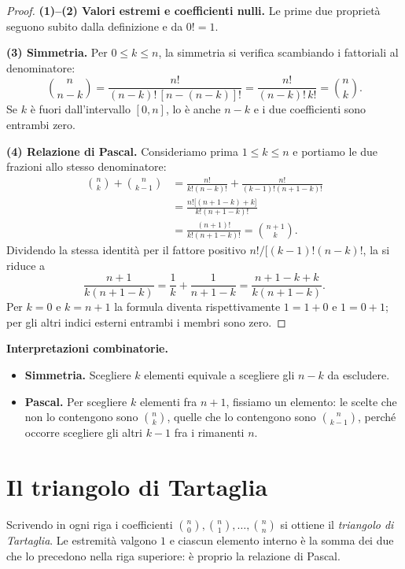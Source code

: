 \begin{proof}
\textbf{(1)--(2) Valori estremi e coefficienti nulli.} Le prime due proprietà seguono subito dalla definizione e da $0!=1$.

\textbf{(3) Simmetria.} Per $0\le k\le n$, la simmetria si verifica scambiando i fattoriali al denominatore:
\[
  \binom n{n-k}
   =\frac{n!}{(n-k)!\,[n-(n-k)]!}
   =\frac{n!}{(n-k)!\,k!}=\binom nk.
\]
Se $k$ è fuori dall'intervallo $[0,n]$, lo è anche $n-k$ e i due coefficienti sono entrambi zero.

\textbf{(4) Relazione di Pascal.} Consideriamo prima $1\le k\le n$ e portiamo le due frazioni allo stesso denominatore:
\begin{align*}
  \binom nk+\binom n{k-1}
  &=\frac{n!}{k!(n-k)!}
    +\frac{n!}{(k-1)!(n+1-k)!}\\
  &=\frac{n!\bigl[(n+1-k)+k\bigr]}{k!(n+1-k)!}\\
  &=\frac{(n+1)!}{k!(n+1-k)!}
   =\binom{n+1}k.
\end{align*}
Dividendo la stessa identità per il fattore positivo $n!/[(k-1)!(n-k)!$, la si riduce a
\[
  \frac{n+1}{k(n+1-k)}
   =\frac1k+\frac1{n+1-k}
   =\frac{n+1-k+k}{k(n+1-k)}.
\]
Per $k=0$ e $k=n+1$ la formula diventa rispettivamente $1=1+0$ e $1=0+1$; per gli altri indici esterni entrambi i membri sono zero.
\end{proof}

\textbf{Interpretazioni combinatorie.}
\begin{itemize}
  \item \textbf{Simmetria.} Scegliere $k$ elementi equivale a scegliere gli $n-k$ da escludere.
  \item \textbf{Pascal.} Per scegliere $k$ elementi fra $n+1$, fissiamo un elemento: le scelte che non lo contengono sono $\binom nk$, quelle che lo contengono sono $\binom n{k-1}$, perché occorre scegliere gli altri $k-1$ fra i rimanenti $n$.
\end{itemize}

\section{Il triangolo di Tartaglia}

Scrivendo in ogni riga i coefficienti $\binom n0,\binom n1,\ldots, \binom nn$ si ottiene il \emph{triangolo di Tartaglia}. Le estremità valgono $1$ e ciascun elemento interno è la somma dei due che lo precedono nella riga superiore: è proprio la relazione di Pascal.

